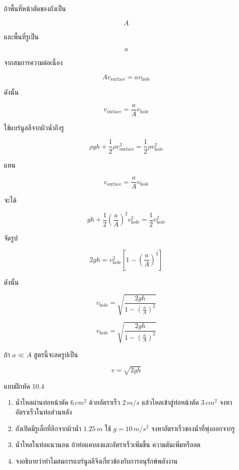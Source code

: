 ถ้าพื้นที่หน้าตัดของถังเป็น

\[
A
\]

และพื้นที่รูเป็น

\[
a
\]

จากสมการความต่อเนื่อง

\[
Av_{\text{surface}}=av_{\text{hole}}
\]

ดังนั้น

\[
v_{\text{surface}}=\frac{a}{A}v_{\text{hole}}
\]

ใช้แบร์นูลลีจากผิวน้ำถึงรู

\[
\rho gh+\frac{1}{2}\rho v_{\text{surface}}^2
=
\frac{1}{2}\rho v_{\text{hole}}^2
\]

แทน

\[
v_{\text{surface}}=\frac{a}{A}v_{\text{hole}}
\]

จะได้

\[
gh+\frac{1}{2}\left(\frac{a}{A}\right)^2v_{\text{hole}}^2
=
\frac{1}{2}v_{\text{hole}}^2
\]

จัดรูป

\[
2gh=
v_{\text{hole}}^2
\left[
1-\left(\frac{a}{A}\right)^2
\right]
\]

ดังนั้น

\[
v_{\text{hole}}
=
\sqrt{
\frac{2gh}
{1-\left(\frac{a}{A}\right)^2}
}
\]

\begin{tcolorbox}[title=รูที่ก้นถังเมื่อพื้นที่ถังไม่ใหญ่มาก]
\[
v_{\text{hole}}
=
\sqrt{
\frac{2gh}
{1-\left(\frac{a}{A}\right)^2}
}
\]

ถ้า $a\ll A$ สูตรนี้จะลดรูปเป็น

\[
v=\sqrt{2gh}
\]
\end{tcolorbox}

\begin{exercisebox}{แบบฝึกหัด 10.4}
\begin{enumerate}
    \item น้ำไหลผ่านท่อหน้าตัด $6\,\si{cm^2}$ ด้วยอัตราเร็ว $2\,\si{m/s}$ แล้วไหลเข้าสู่ท่อหน้าตัด $3\,\si{cm^2}$ จงหาอัตราเร็วในท่อส่วนหลัง
    \item ถังเปิดมีรูเล็กที่ลึกจากผิวน้ำ $1.25\,\si{m}$ ใช้ $g=10\,\si{m/s^2}$ จงหาอัตราเร็วของน้ำที่พุ่งออกจากรู
    \item น้ำไหลในท่อแนวนอน ถ้าท่อแคบลงและอัตราเร็วเพิ่มขึ้น ความดันเพิ่มหรือลด
    \item จงอธิบายว่าทำไมสมการแบร์นูลลีจึงเกี่ยวข้องกับการอนุรักษ์พลังงาน
\end{enumerate}
\end{exercisebox}

